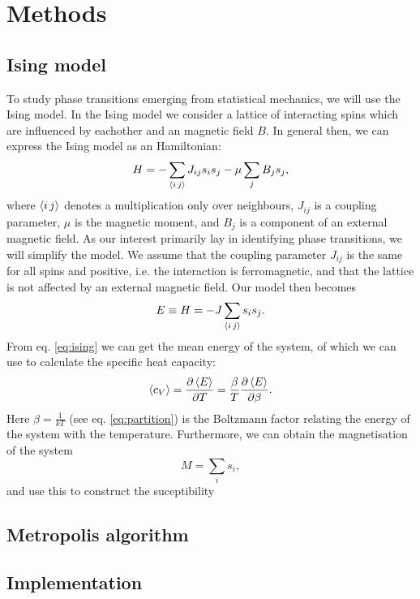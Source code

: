 \section{Methods}
\label{sec:methods}

\subsection{Ising model}
\label{sec:ising}
To study phase transitions emerging from statistical mechanics, we will use the Ising model. In the Ising model we consider a lattice of interacting spins which are influenced by eachother and an magnetic field $B$. In general then, we can express the Ising model as an Hamiltonian:
  \begin{equation}
  \label{eq:isingH}
    H = -\sum_{\expval{i\, j}}J_{ij}s_i s_j - \mu\sum_j B_js_j,
  \end{equation}
where $\expval{i\,j}$ denotes a multiplication only over neighbours, $J_{ij}$ is a coupling parameter, $\mu$ is the magnetic moment, and $B_j$ is a component of an external magnetic field. As our interest primarily lay in identifying phase transitions, we will simplify the model. We assume that the coupling parameter $J_{ij}$ is the same for all spins and positive, i.e. the interaction is ferromagnetic, and that the lattice is not affected by an external magnetic field. Our model then becomes
  \begin{equation}
  \label{eq:ising}
    E \equiv H = -J\sum_{\expval{i\, j}}s_i s_j.
  \end{equation}
From eq. \ref{eq:ising} we can get the mean energy of the system, of which we can use to calculate the specific heat capacity:
  \begin{equation}
    \label{eq:energy}
    \expval{c_V} = \pdv{\expval{E}}{T} = \frac{\beta}{T}\pdv{\expval{E}}{\beta}.
  \end{equation}
Here $\beta = \frac{1}{kT}$ (see eq. \ref{eq:partition}) is the Boltzmann factor relating the energy of the system with the temperature. Furthermore, we can obtain the magnetisation of the system
  \begin{equation}
  \label{eq:magnet}
    M = \sum_i s_i,
  \end{equation}
and use this to construct the suceptibility

\subsection{Metropolis algorithm}
\label{sec:metropolis}

\subsection{Implementation}
\label{sec:implementation}
